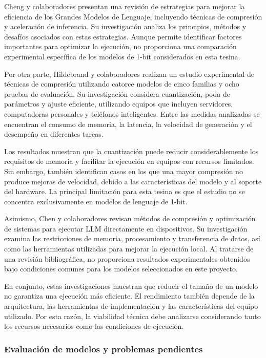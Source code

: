 Cheng y colaboradores \cite{efficientLLMs} presentan una revisión de estrategias para mejorar la eficiencia de los Grandes Modelos de Lenguaje, incluyendo técnicas de compresión y aceleración de inferencia. Su investigación analiza los principios, métodos y desafíos asociados con estas estrategias. Aunque permite identificar factores importantes para optimizar la ejecución, no proporciona una comparación experimental específica de los modelos de 1-bit considerados en esta tesina.

Por otra parte, Hildebrand y colaboradores \cite{compressionComparison2026} realizan un estudio experimental de técnicas de compresión utilizando catorce modelos de cinco familias y ocho pruebas de evaluación. Su investigación considera cuantización, poda de parámetros y ajuste eficiente, utilizando equipos que incluyen servidores, computadoras personales y teléfonos inteligentes. Entre las medidas analizadas se encuentran el consumo de memoria, la latencia, la velocidad de generación y el desempeño en diferentes tareas.

Los resultados muestran que la cuantización puede reducir considerablemente los requisitos de memoria y facilitar la ejecución en equipos con recursos limitados. Sin embargo, también identifican casos en los que una mayor compresión no produce mejoras de velocidad, debido a las características del modelo y al soporte del hardware. La principal limitación para esta tesina es que el estudio no se concentra exclusivamente en modelos de lenguaje de 1-bit.

Asimismo, Chen y colaboradores \cite{onDeviceSurvey2026} revisan métodos de compresión y optimización de sistemas para ejecutar LLM directamente en dispositivos. Su investigación examina las restricciones de memoria, procesamiento y transferencia de datos, así como las herramientas utilizadas para mejorar la ejecución local. Al tratarse de una revisión bibliográfica, no proporciona resultados experimentales obtenidos bajo condiciones comunes para los modelos seleccionados en este proyecto.

En conjunto, estas investigaciones muestran que reducir el tamaño de un modelo no garantiza una ejecución más eficiente. El rendimiento también depende de la arquitectura, las herramientas de implementación y las características del equipo utilizado. Por esta razón, la viabilidad técnica debe analizarse considerando tanto los recursos necesarios como las condiciones de ejecución.


\subsubsection{Evaluación de modelos y problemas pendientes}

